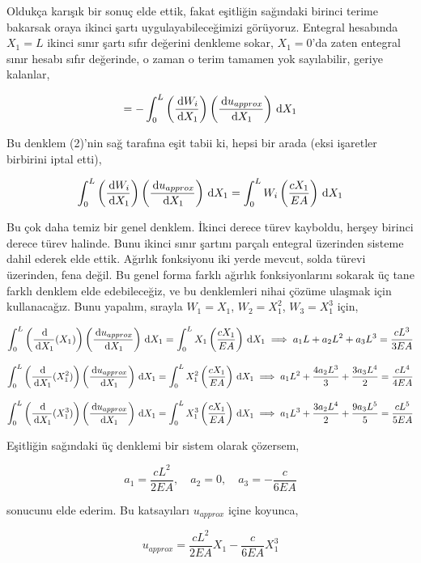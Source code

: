\documentclass[12pt,fleqn]{article}\usepackage{../../common}
\begin{document}
Oldukça karışık bir sonuç elde ettik, fakat eşitliğin sağındaki birinci terime
bakarsak oraya ikinci şartı uygulayabileceğimizi görüyoruz. Entegral hesabında
$X_1=L$ ikinci sınır şartı sıfır değerini denkleme sokar, $X_1=0$'da zaten
entegral sınır hesabı sıfır değerinde, o zaman o terim tamamen yok sayılabilir,
geriye kalanlar,

$$
= - \int_{0}^{L} \left( \frac{\,\mathrm{d} W_i}{\,\mathrm{d} X_1}  \right)
\left( \frac{\,\mathrm{d} u_{approx}}{\,\mathrm{d} X_1}\right) \,\mathrm{d} X_1
$$

Bu denklem (2)'nin sağ tarafına eşit tabii ki, hepsi bir arada (eksi
işaretler birbirini iptal etti),

$$
\int_{0}^{L} \left( \frac{\,\mathrm{d} W_i}{\,\mathrm{d} X_1}  \right)
\left( \frac{\,\mathrm{d} u_{approx}}{\,\mathrm{d} X_1}\right) \,\mathrm{d} X_1 =
\int_{0}^{L} W_i  \left( \frac{c X_1}{EA} \right) \,\mathrm{d} X_1
$$

Bu çok daha temiz bir genel denklem. İkinci derece türev kayboldu, herşey
birinci derece türev halinde. Bunu ikinci sınır şartını parçalı entegral
üzerinden sisteme dahil ederek elde ettik. Ağırlık fonksiyonu iki yerde mevcut,
solda türevi üzerinden, fena değil. Bu genel forma farklı ağırlık
fonksiyonlarını sokarak üç tane farklı denklem elde edebileceğiz, ve bu
denklemleri nihai çözüme ulaşmak için kullanacağız. Bunu yapalım, sırayla
$W_1 = X_1$, $W_2 = X_1^2$, $W_3 = X_1^3$ için,

$$
\int_{0}^{L} \left( \frac{\,\mathrm{d}}{\,\mathrm{d} X_1} (X_1) \right)
\left( \frac{\,\mathrm{d} u_{approx}}{\,\mathrm{d} X_1}\right) \,\mathrm{d} X_1 =
\int_{0}^{L} X_1  \left( \frac{c X_1}{EA} \right) \,\mathrm{d} X_1
\implies a_1 L + a_2 L^2 + a_3 L^3 = \frac{c L^3}{3EA}
$$

$$
\int_{0}^{L} \left( \frac{\,\mathrm{d}}{\,\mathrm{d} X_1} (X_1^2) \right)
\left( \frac{\,\mathrm{d} u_{approx}}{\,\mathrm{d} X_1}\right) \,\mathrm{d} X_1 =
\int_{0}^{L} X_1^2  \left( \frac{c X_1}{EA} \right) \,\mathrm{d} X_1
\implies a_1 L^2 + \frac{4 a_2 L^3}{3} + \frac{3 a_3 L^4}{2} = \frac{cL^4}{4EA}
$$

$$
\int_{0}^{L} \left( \frac{\,\mathrm{d}}{\,\mathrm{d} X_1} (X_1^3) \right)
\left( \frac{\,\mathrm{d} u_{approx}}{\,\mathrm{d} X_1}\right) \,\mathrm{d} X_1 =
\int_{0}^{L} X_1^3  \left( \frac{c X_1}{EA} \right) \,\mathrm{d} X_1
\implies a_1 L^3 + \frac{3 a_2 L^4}{2} + \frac{9 a_3 L^5}{5} = \frac{cL^5}{5EA}
$$

Eşitliğin sağındaki üç denklemi bir sistem olarak çözersem,

$$
a_1 = \frac{c L^2}{2EA}, \quad a_2 = 0, \quad a_3 = -\frac{c}{6EA}
$$

sonucunu elde ederim. Bu katsayıları $u_{approx}$ içine koyunca,

$$
u_{approx} = \frac{c L^2}{2EA} X_1 -\frac{c}{6EA} X_1^3
$$
\end{document}
